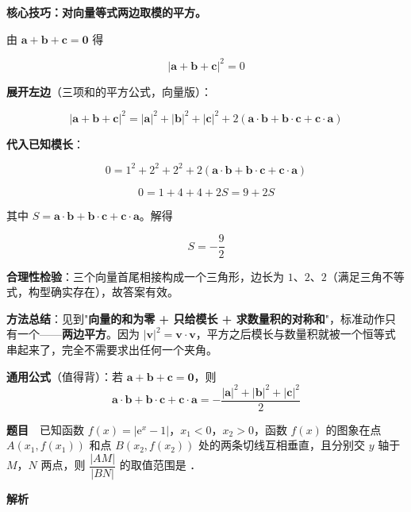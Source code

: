 \textbf{核心技巧：对向量等式两边取模的平方。}

由 $\boldsymbol a+\boldsymbol b+\boldsymbol c=\boldsymbol 0$ 得

\[|\boldsymbol a+\boldsymbol b+\boldsymbol c|^{2}=0\]

\textbf{展开左边}（三项和的平方公式，向量版）：

\[|\boldsymbol a+\boldsymbol b+\boldsymbol c|^{2}=|\boldsymbol a|^{2}+|\boldsymbol b|^{2}+|\boldsymbol c|^{2}+2\left(\boldsymbol a\cdot\boldsymbol b+\boldsymbol b\cdot\boldsymbol c+\boldsymbol c\cdot\boldsymbol a\right)\]

\textbf{代入已知模长}：

\[0=1^{2}+2^{2}+2^{2}+2\left(\boldsymbol a\cdot\boldsymbol b+\boldsymbol b\cdot\boldsymbol c+\boldsymbol c\cdot\boldsymbol a\right)\]

\[0=1+4+4+2S=9+2S\]

其中 $S=\boldsymbol a\cdot\boldsymbol b+\boldsymbol b\cdot\boldsymbol c+\boldsymbol c\cdot\boldsymbol a$。解得

\[S=-\frac92\]


\begin{gktip}
\textbf{合理性检验}：三个向量首尾相接构成一个三角形，边长为 $1$、$2$、$2$（满足三角不等式，构型确实存在），故答案有效。

\textbf{方法总结}：见到"\textbf{向量的和为零 + 只给模长 + 求数量积的对称和}"，标准动作只有一个——\textbf{两边平方}。因为 $|\boldsymbol v|^{2}=\boldsymbol v\cdot\boldsymbol v$，平方之后模长与数量积就被一个恒等式串起来了，完全不需要求出任何一个夹角。

\textbf{通用公式}（值得背）：若 $\boldsymbol a+\boldsymbol b+\boldsymbol c=\boldsymbol 0$，则
\[\boldsymbol a\cdot\boldsymbol b+\boldsymbol b\cdot\boldsymbol c+\boldsymbol c\cdot\boldsymbol a=-\frac{|\boldsymbol a|^{2}+|\boldsymbol b|^{2}+|\boldsymbol c|^{2}}2\]
\end{gktip}

\par\medskip


\textbf{题目}　已知函数 $f(x)=\left|\mathrm e^{x}-1\right|$，$x_1<0$，$x_2>0$，函数 $f(x)$ 的图象在点 $A\left(x_1,f\left(x_1\right)\right)$ 和点 $B\left(x_2,f\left(x_2\right)\right)$ 处的两条切线互相垂直，且分别交 $y$ 轴于 $M$，$N$ 两点，则 $\dfrac{|AM|}{|BN|}$ 的取值范围是 \gkblank{}．

\textbf{解析}

